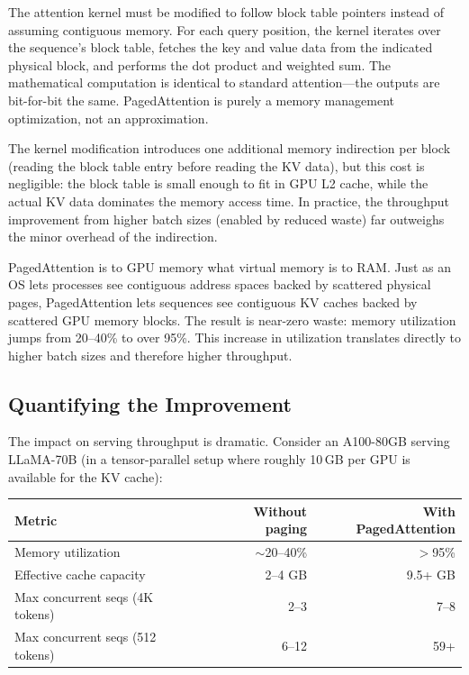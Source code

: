 The attention kernel must be modified to follow block table pointers instead of assuming contiguous memory. For each query position, the kernel iterates over the sequence's block table, fetches the key and value data from the indicated physical block, and performs the dot product and weighted sum. The mathematical computation is identical to standard attention---the outputs are bit-for-bit the same. PagedAttention is purely a memory management optimization, not an approximation.

The kernel modification introduces one additional memory indirection per block (reading the block table entry before reading the KV data), but this cost is negligible: the block table is small enough to fit in GPU L2 cache, while the actual KV data dominates the memory access time. In practice, the throughput improvement from higher batch sizes (enabled by reduced waste) far outweighs the minor overhead of the indirection.

\begin{insightbox}
PagedAttention is to GPU memory what virtual memory is to RAM. Just as an OS lets processes see contiguous address spaces backed by scattered physical pages, PagedAttention lets sequences see contiguous KV caches backed by scattered GPU memory blocks. The result is near-zero waste: memory utilization jumps from 20--40\% to over 95\%. This increase in utilization translates directly to higher batch sizes and therefore higher throughput.
\end{insightbox}

\subsection{Quantifying the Improvement}

The impact on serving throughput is dramatic. Consider an A100-80GB serving LLaMA-70B (in a tensor-parallel setup where roughly 10\,GB per GPU is available for the KV cache):

\begin{center}
\begin{tabular}{lrr}
\hline
\textbf{Metric} & \textbf{Without paging} & \textbf{With PagedAttention} \\
\hline
Memory utilization & $\sim$20--40\% & $>$95\% \\
Effective cache capacity & 2--4 GB & 9.5+ GB \\
Max concurrent seqs (4K tokens) & 2--3 & 7--8 \\
Max concurrent seqs (512 tokens) & 6--12 & 59+ \\
\hline
\end{tabular}
\end{center}

